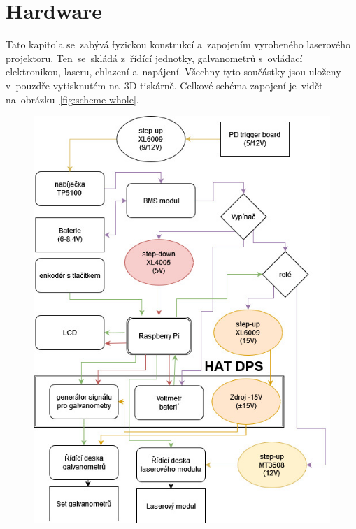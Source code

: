 \chapter{Hardware}
Tato kapitola se~zabývá fyzickou konstrukcí a~zapojením vyrobeného laserového projektoru. Ten~se~skládá z~řídící jednotky, galvanometrů s~ovládací elektronikou, laseru, chlazení a~napájení. Všechny tyto součástky jsou uloženy v~pouzdře vytisknutém na~3D tiskárně. Celkové schéma zapojení je~vidět na~obrázku~\ref{fig:scheme-whole}.

\begin{figure}[H]
  \centering
  \includegraphics[width=\textwidth{}, trim=0 400 0 0, clip]{img/whole-scheme.jpg}
\end{figure}
\clearpage
